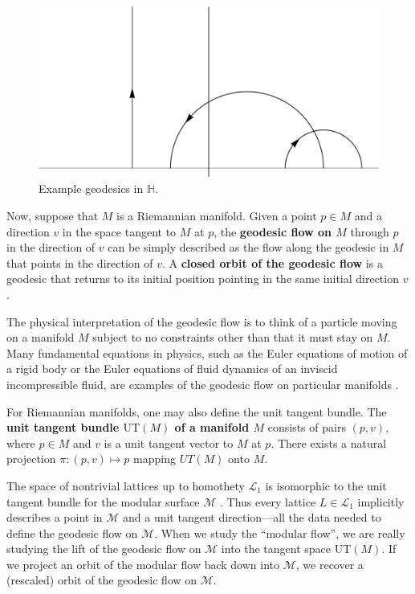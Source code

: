 \documentclass[12pt,twoside]{reedthesis}
\theoremstyle{definition}
\newcommand{\LS}{\mathcal{L}}
\newcommand{\UT}{\mathrm{UT}}
\newcommand{\defnphrase}[1]{\textbf{#1}}
\begin{document}
\begin{figure}[t]
  \centering
  \includegraphics[width=0.6\linewidth]{figures/geodesics_in_h.pdf}
  \caption{Example geodesics in $\mathbb{H}$.}
  \label{fig:geodesics_in_h}
\end{figure}

Now, suppose that $M$ is a Riemannian manifold.
Given a point $p \in M$ and a direction $v$ in the space tangent to $M$ at $p$, the \defnphrase{geodesic flow on $M$} through $p$ in the direction of $v$ can be simply described as the flow along the geodesic in $M$ that points in the direction of $v$.
A \defnphrase{closed orbit of the geodesic flow} is a geodesic that returns to its initial position pointing in the same initial direction $v$.

The physical interpretation of the geodesic flow is to think of a particle moving on a manifold $M$ subject to no constraints other than that it must stay on $M$.
Many fundamental equations in physics, such as the Euler equations of motion of a rigid body or the Euler equations of fluid dynamics of an inviscid incompressible fluid, are examples of the geodesic flow on particular manifolds \cite{tao} \cite{arnold66}.

For Riemannian manifolds, one may also define the unit tangent bundle.
The \defnphrase{unit tangent bundle $\UT(M)$ of a manifold $M$} consists of pairs $(p, v)$, where $p \in M$ and $v$ is a unit tangent vector to $M$ at $p$. 
There exists a natural projection $\pi : (p, v) \mapsto p$ mapping $UT(M)$ onto $M$.

The space of nontrivial lattices up to homothety $\LS_1$ is isomorphic to the unit tangent bundle for the modular surface $\mathcal{M}$ \cite[9]{silverman1994}.
Thus every lattice $L \in \LS_1$ implicitly describes a point in $\mathcal{M}$ and a unit tangent direction---all the data needed to define the geodesic flow on $\mathcal{M}$.
When we study the ``modular flow'', we are really studying the lift of the geodesic flow on $\mathcal{M}$ into the tangent space $\mathrm{UT}(M)$.
If we project an orbit of the modular flow  back down into $\mathcal{M}$, we recover a (rescaled) orbit of the geodesic flow on $\mathcal{M}$.
\end{document}
